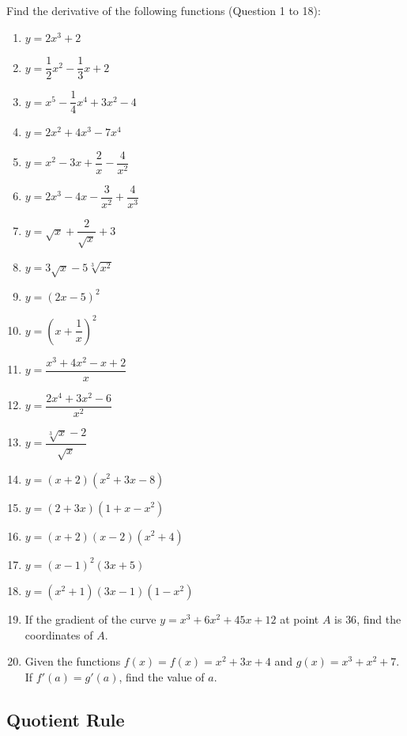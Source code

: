 \documentclass[12pt]{report}
\begin{document}
\setlength{\columnseprule}{1pt}
\setlength{\columnsep}{24pt}
\begin{multicols}{2}
  \noindent Find the derivative of the following functions (Question 1 to 18):
  \begin{enumerate}
    \item $y=2x^{3}+2$
    \item $y={\dfrac{1}{2}}x^{2}-{\dfrac{1}{3}}x+2$
    \item $y=x^{5}-{\dfrac{1}{4}}x^{4}+3x^{2}-4$
    \item $y=2x^{2}+4x^{3}-7x^{4}$
    \item $y=x^{2}-3x+{\dfrac{2}{x}}-{\dfrac{4}{x^{2}}}$
    \item $y=2x^{3}-4x-{\dfrac{3}{x^{2}}}+{\dfrac{4}{x^{3}}}$
    \item $y={\sqrt{x}}+{\dfrac{2}{\sqrt{x}}}+3$
    \item $y=3{\sqrt{x}}-5{\sqrt[3]{x^{2}}}$
    \item $y=(2x-5)^{2}$
    \item $y=\left(x+{\dfrac{1}{x}}\right)^{2}$
    \item $y=\dfrac{x^{3}+4x^{2}-x+2}{x}$
    \item $y=\dfrac{2x^{4}+3x^{2}-6}{x^{2}}$
    \item $y=\dfrac{\sqrt[3]{x}-2}{\sqrt{x}}$
    \item $y=\left(x+2\right)\left(x^{2}+3x-8\right)$
    \item $y=\left(2+3x\right)\left(1+x-x^{2}\right)$
    \item $y=\left(x+2\right)\left(x-2\right)\left(x^{2}+4\right)$
    \item $y=(x-1)^{2}(3x+5)$
    \item $y=\left(x^{2}+1\right)\left(3x-1\right)\left(1-x^{2}\right)$
    \item If the gradient of the curve $y = x^3 + 6x^2 + 45x + 12$ at point $A$ is $36$,
          find the coordinates of $A$.
    \item Given the functions $f(x) = f(x) = x^2 + 3x + 4$ and $g(x) = x^3 + x^2 + 7$. If
          $f'(a) = g'(a)$, find the value of $a$.
  \end{enumerate}
\end{multicols}

\subsection*{Quotient Rule}
\end{document}
